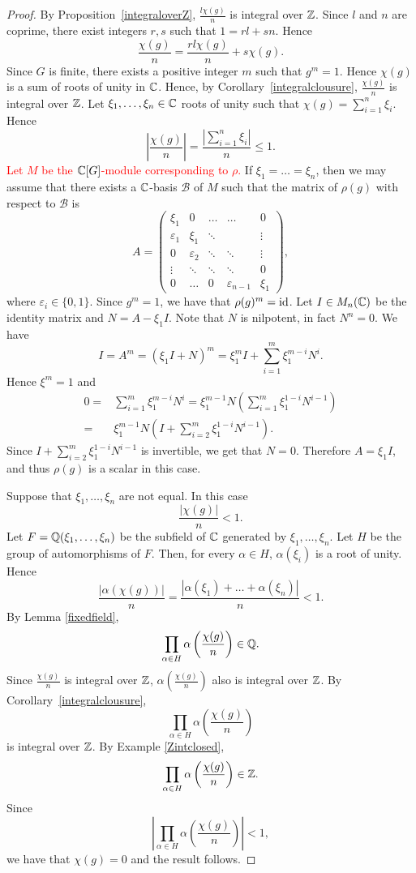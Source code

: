 \begin{proof}
By Proposition~\ref{integraloverZ}, $\frac{l\chi(g)}{n}$ is integral over $\mathbb{Z}$. Since $l$ and $n$ are coprime, there exist integers
$r,s$ such that $1=rl+sn$. Hence
\[ \frac{\chi(g)}{n}=\frac{rl\chi(g)}{n}+s\chi(g).\]
Since $G$ is finite, there exists a positive integer $m$ such that $g^m=1$. Hence $\chi(g)$ is a sum of roots of unity in $\mathbb{C}$.
Hence, by Corollary~\ref{integralclousure}, $\frac{\chi(g)}{n}$ is integral over $\mathbb{Z}$. Let $\xi_1,\dots ,\xi_n\in\mathbb{C}$ roots of unity
such that $\chi(g)=\sum_{i=1}^n\xi_i$. Hence
\[\left|\frac{\chi(g)}{n}\right|=\frac{\left|\sum_{i=1}^n\xi_i\right|}{n}\leq 1.\]
\textcolor{red}{Let $M$ be the $\mathbb{C}[G]$-module corresponding to $\rho$.}
If $\xi_1=\dots =\xi_n$, then we may assume that there exists a $\mathbb{C}$-basis $\mathcal{B}$ of $M$ such that the matrix of 
$\rho(g)$ with respect to $\mathcal{B}$ is
\[ A=\left(\begin{array}{ccccc}
\xi_1&0&\ldots&\ldots&0\\
\varepsilon_1&\xi_1&\ddots&&\vdots\\
0&\varepsilon_2&\ddots&\ddots&\vdots\\
\vdots&\ddots&\ddots&\ddots&0\\
0&\ldots&0&\varepsilon_{n-1}&\xi_1\end{array}\right),\]
where $\varepsilon_i\in\{ 0,1\}$. Since 
$g^m=1$, we have that $\rho(g)^m=\operatorname{id}$. Let $I\in M_n(\mathbb{C})$ be the identity matrix and $N=A-\xi_1I$. 
Note that $N$ is nilpotent, in fact $N^n=0$. We have
\[ I=A^m=(\xi_1I+N)^m=\xi_1^mI+\sum_{i=1}^m\xi_1^{m-i}N^{i}.
\]
Hence $\xi^m=1$ and
\begin{align*}
    0=&\sum_{i=1}^m\xi_1^{m-i}N^{i}=\xi_1^{m-1}N\left(\sum_{i=1}^m\xi_1^{1-i}N^{i-1}\right)\\
    =&\xi_1^{m-1}N\left( I+\sum_{i=2}^m\xi_1^{1-i}N^{i-1}\right).
\end{align*}
Since $ I+\sum_{i=2}^m\xi_1^{1-i}N^{i-1}$ is invertible, we get that $N=0$. Therefore $A=\xi_1I$, and thus $\rho(g)$ is a scalar in this case.

Suppose that $\xi_1,\dots ,\xi_n$ are not equal. In this case
\[\frac{|\chi(g)|}{n}<1.\]
Let $F=\mathbb{Q}(\xi_1,\dots ,\xi_n)$ be the subfield of $\mathbb{C}$ generated by $\xi_1,\dots ,\xi_n$. Let $H$ be the group of automorphisms of $F$.
Then, for every $\alpha\in H$, $\alpha(\xi_i)$ is a root of unity. Hence
\[\frac{|\alpha(\chi(g))|}{n}=\frac{|\alpha(\xi_1)+\dots +\alpha(\xi_n)|}{n}<1.\]
By Lemma \ref{fixedfield}, 
\[\prod_{\alpha\in H}\alpha\left(\frac{\chi(g)}{n}\right)\in \mathbb{Q}.\]
Since $\frac{\chi(g)}{n}$ is integral over $\mathbb{Z}$, $\alpha\left(\frac{\chi(g)}{n}\right)$ also is integral over $\mathbb{Z}$. By Corollary~\ref{integralclousure},  
\[\prod_{\alpha\in H}\alpha\left(\frac{\chi(g)}{n}\right)\]
is integral over $\mathbb{Z}$. By Example \ref{Zintclosed}, 
\[\prod_{\alpha\in H}\alpha\left(\frac{\chi(g)}{n}\right)\in\mathbb{Z}.\]
Since
\[\left|\prod_{\alpha\in H}\alpha\left(\frac{\chi(g)}{n}\right)\right|<1,\]
we have that $\chi(g)=0$ and the result follows.
\end{proof}

